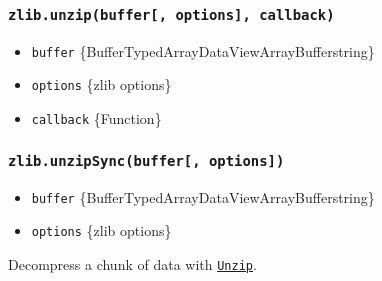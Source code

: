 \subsubsection{\texorpdfstring{\texttt{zlib.unzip(buffer{[},\ options{]},\ callback)}}{zlib.unzip(buffer{[}, options{]}, callback)}}\label{zlib.unzipbuffer-options-callback}

\begin{itemize}
\tightlist
\item
  \texttt{buffer}
  \{Buffer\textbar TypedArray\textbar DataView\textbar ArrayBuffer\textbar string\}
\item
  \texttt{options} \{zlib options\}
\item
  \texttt{callback} \{Function\}
\end{itemize}

\subsubsection{\texorpdfstring{\texttt{zlib.unzipSync(buffer{[},\ options{]})}}{zlib.unzipSync(buffer{[}, options{]})}}\label{zlib.unzipsyncbuffer-options}

\begin{itemize}
\tightlist
\item
  \texttt{buffer}
  \{Buffer\textbar TypedArray\textbar DataView\textbar ArrayBuffer\textbar string\}
\item
  \texttt{options} \{zlib options\}
\end{itemize}

Decompress a chunk of data with
\hyperref[class-zlibunzip]{\texttt{Unzip}}.
